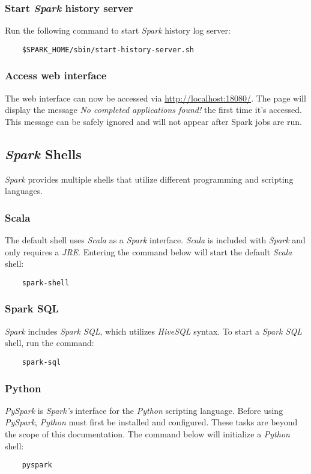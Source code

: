 \documentclass{article}
\begin{document}
    \subsubsection{Start \emph{Spark} history server}
    \label{subsec:sparklog}
    Run the following command to start \emph{Spark} history log server:
    \begin{verbatim}
    $SPARK_HOME/sbin/start-history-server.sh
    \end{verbatim}

    \subsubsection{Access web interface}
    The web interface can now be accessed via \url{http://localhost:18080/}. The page will
    display the message \emph{No completed applications found!} the first time it's accessed.
    This message can be safely ignored and will not appear after Spark jobs are run.

  \subsection{\emph{Spark} Shells}
  \emph{Spark} provides multiple shells that utilize different programming and scripting languages.

    \subsubsection{Scala}
    The default shell uses \emph{Scala} as a \emph{Spark} interface. \emph{Scala} is included
    with \emph{Spark} and only requires a \emph{JRE}. Entering the command below will start
    the default \emph{Scala} shell:
    \begin{verbatim}
    spark-shell
    \end{verbatim}

    \subsubsection{Spark SQL}
    \emph{Spark} includes \emph{Spark SQL}, which utilizes \emph{HiveSQL} syntax. To start
    a \emph{Spark SQL} shell, run the command:
    \begin{verbatim}
    spark-sql
    \end{verbatim}

    \subsubsection{Python}
    \emph{PySpark} is \emph{Spark's} interface for the \emph{Python} scripting language.
    Before using \emph{PySpark}, \emph{Python} must first be installed and configured.
    These tasks are beyond the scope of this documentation. The command below will initialize
    a \emph{Python} shell:
    \begin{verbatim}
    pyspark
    \end{verbatim}
\end{document}
